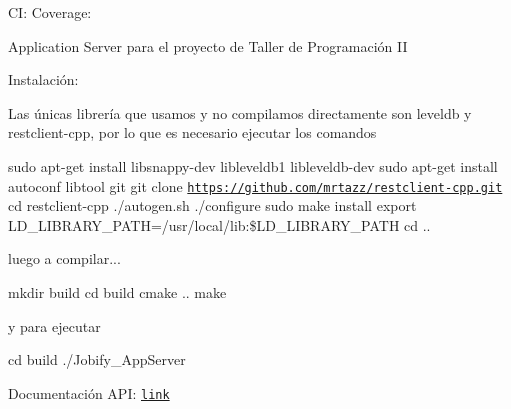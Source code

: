 CI\+: \href{https://travis-ci.org/alelevinas/Jobify_AppServer}{\tt } Coverage\+: \href{https://coveralls.io/github/alelevinas/Jobify_AppServer?branch=master}{\tt }

Application Server para el proyecto de Taller de Programación II

Instalación\+:

Las únicas librería que usamos y no compilamos directamente son leveldb y restclient-\/cpp, por lo que es necesario ejecutar los comandos

sudo apt-\/get install libsnappy-\/dev libleveldb1 libleveldb-\/dev sudo apt-\/get install autoconf libtool git git clone \href{https://github.com/mrtazz/restclient-cpp.git}{\tt https\+://github.\+com/mrtazz/restclient-\/cpp.\+git} cd restclient-\/cpp ./autogen.sh ./configure sudo make install export L\+D\+\_\+\+L\+I\+B\+R\+A\+R\+Y\+\_\+\+P\+A\+TH=/usr/local/lib\+:\$\+L\+D\+\_\+\+L\+I\+B\+R\+A\+R\+Y\+\_\+\+P\+A\+TH cd ..

luego a compilar...

mkdir build cd build cmake .. make

y para ejecutar

cd build ./\+Jobify\+\_\+\+App\+Server

Documentación A\+PI\+: \href{http://rebilly.github.io/ReDoc/?url=https://raw.githubusercontent.com/alelevinas/Jobify_AppServer/master/jobify-appserver-serverAPI.yaml}{\tt link} 